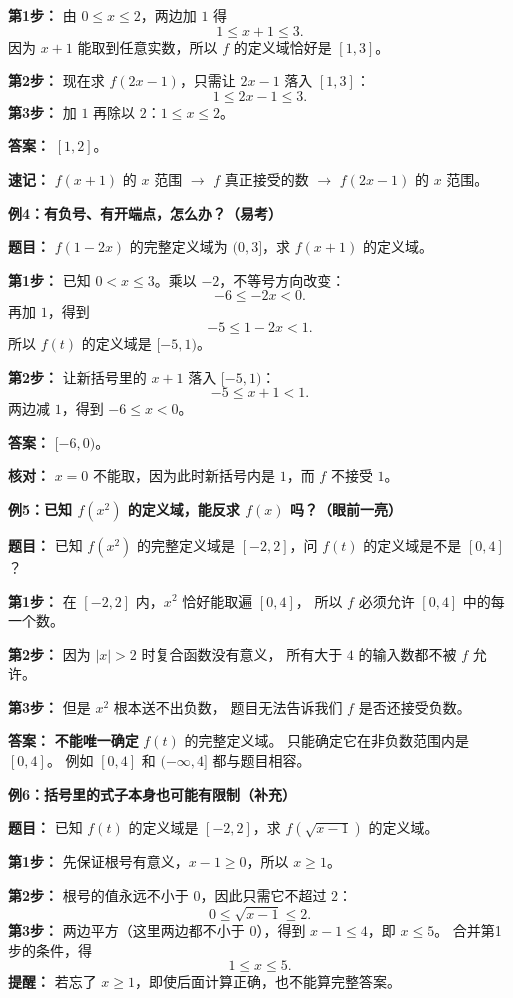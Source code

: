 \begin{examplebox}
\textbf{第1步：} 由 $0\le x\le2$，两边加 $1$ 得
\[
 1\le x+1\le3.
\]
因为 $x+1$ 能取到任意实数，所以 $f$ 的定义域恰好是 $[1,3]$。

\textbf{第2步：} 现在求 $f(2x-1)$，只需让 $2x-1$ 落入 $[1,3]$：
\[
 1\le2x-1\le3.
\]
\textbf{第3步：} 加 $1$ 再除以 $2$：$1\le x\le2$。

\textbf{答案：} $\boxed{[1,2]}$。

\textbf{速记：} $f(x+1)$ 的 $x$ 范围 $\to$ $f$ 真正接受的数 $\to$ $f(2x-1)$ 的 $x$ 范围。

\medskip
\begin{minipage}{\linewidth}
\textbf{\textcolor{CExample}{例4：有负号、有开端点，怎么办？（易考）}}
\begin{center}\end{center}
\end{minipage}



\textbf{题目：} $f(1-2x)$ 的完整定义域为 $(0,3]$，求 $f(x+1)$ 的定义域。

\textbf{第1步：} 已知 $0<x\le3$。乘以 $-2$，不等号方向改变：
\[
 -6\le -2x<0.
\]
再加 $1$，得到
\[
 -5\le1-2x<1.
\]
所以 $f(t)$ 的定义域是 $[-5,1)$。

\textbf{第2步：} 让新括号里的 $x+1$ 落入 $[-5,1)$：
\[
 -5\le x+1<1.
\]
两边减 $1$，得到 $-6\le x<0$。

\textbf{答案：} $\boxed{[-6,0)}$。

\textbf{核对：} $x=0$ 不能取，因为此时新括号内是 $1$，而 $f$ 不接受 $1$。

\medskip
\textbf{\textcolor{CExample}{例5：已知 $f(x^2)$ 的定义域，能反求 $f(x)$ 吗？（眼前一亮）}}

\textbf{题目：} 已知 $f(x^2)$ 的完整定义域是 $[-2,2]$，问 $f(t)$ 的定义域是不是 $[0,4]$？

\textbf{第1步：} 在 $[-2,2]$ 内，$x^2$ 恰好能取遍 $[0,4]$，
所以 $f$ 必须允许 $[0,4]$ 中的每一个数。

\textbf{第2步：} 因为 $|x|>2$ 时复合函数没有意义，
所有大于 $4$ 的输入数都不被 $f$ 允许。

\textbf{第3步：} 但是 $x^2$ 根本送不出负数，
题目无法告诉我们 $f$ 是否还接受负数。

\textbf{答案：} \textbf{不能唯一确定} $f(t)$ 的完整定义域。
只能确定它在非负数范围内是 $[0,4]$。
例如 $[0,4]$ 和 $(-\infty,4]$ 都与题目相容。

\medskip
\textbf{\textcolor{CExample}{例6：括号里的式子本身也可能有限制（补充）}}

\textbf{题目：} 已知 $f(t)$ 的定义域是 $[-2,2]$，求 $f(\sqrt{x-1})$ 的定义域。

\textbf{第1步：} 先保证根号有意义，$x-1\ge0$，所以 $x\ge1$。

\textbf{第2步：} 根号的值永远不小于 $0$，因此只需它不超过 $2$：
\[
 0\le\sqrt{x-1}\le2.
\]
\textbf{第3步：} 两边平方（这里两边都不小于 $0$），得到
$x-1\le4$，即 $x\le5$。
合并第1步的条件，得
\[
 \boxed{1\le x\le5}.
\]
\textbf{提醒：} 若忘了 $x\ge1$，即使后面计算正确，也不能算完整答案。
\end{examplebox}
